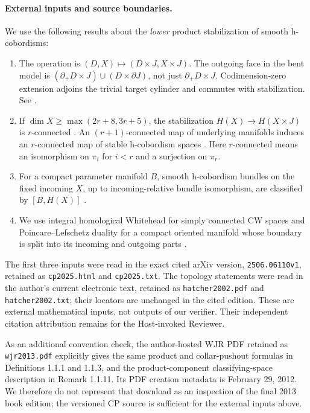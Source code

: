 \documentclass[11pt]{article}
\begin{document}
\paragraph{External inputs and source boundaries.}
We use the following results about the \emph{lower} product stabilization
of smooth h-cobordisms:
\begin{enumerate}
\item The operation is $(D,X)\mapsto(D\times J,X\times J)$.
The outgoing face in the bent model is
$(\partial_+D\times J)\cup(D\times\partial J)$, not just
$\partial_+D\times J$. Codimension-zero extension adjoins the
trivial target cylinder and commutes with stabilization.
See \cite[Definition 2.7, Remark 2.13, Definition 2.15]{CP}.
\item If $\dim X\geq\max(2r+8,3r+5)$, the stabilization
$H(X)\to H(X\times J)$ is $r$-connected
\cite[Theorem 2.16]{CP}. An $(r+1)$-connected map of underlying
manifolds induces an $r$-connected map of stable h-cobordism spaces
\cite[Theorem 2.17]{CP}. Here $r$-connected means an isomorphism
on $\pi_i$ for $i<r$ and a surjection on $\pi_r$.
\item For a compact parameter manifold $B$, smooth h-cobordism bundles
on the fixed incoming $X$, up to incoming-relative bundle isomorphism,
are classified by $[B,H(X)]$ \cite[Proposition 2.11]{CP}.
\item We use integral homological Whitehead for simply connected CW
spaces and Poincare--Lefschetz duality for a compact oriented manifold
whose boundary is split into its incoming and outgoing parts
\cite[Corollary 4.33 and Theorem 3.43]{Hatcher}.
\end{enumerate}
The first three inputs were read in the exact cited arXiv version,
\texttt{2506.06110v1}, retained as \texttt{cp2025.html} and
\texttt{cp2025.txt}. The topology statements were read in the author's
current electronic text, retained as \texttt{hatcher2002.pdf} and
\texttt{hatcher2002.txt}; their locators are unchanged in the cited edition.
These are external mathematical inputs, not outputs of our verifier.
Their independent citation attribution remains for the Host-invoked Reviewer.

As an additional convention check, the author-hosted WJR PDF retained as
\texttt{wjr2013.pdf} explicitly gives the same product and collar-pushout
formulas in Definitions 1.1.1 and 1.1.3, and the product-component
classifying-space description in Remark 1.1.11. Its PDF creation metadata
is February 29, 2012. We therefore do not represent that download as an
inspection of the final 2013 book edition; the versioned CP source is
sufficient for the external inputs above.
\end{document}
